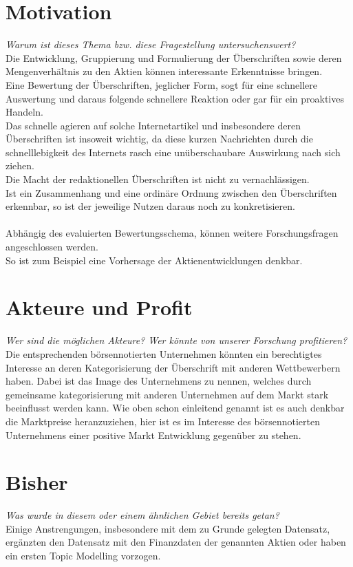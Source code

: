 \section{Motivation}
{\scriptsize \textit{Warum ist dieses Thema bzw. diese Fragestellung untersuchenswert?}}\\
Die Entwicklung, Gruppierung und Formulierung der Überschriften sowie deren Mengenverhältnis zu den Aktien können interessante Erkenntnisse bringen.\\
Eine Bewertung der Überschriften, jeglicher Form, sogt für eine schnellere Auswertung und daraus folgende schnellere Reaktion oder gar für ein proaktives Handeln.\\
Das schnelle agieren auf solche Internetartikel und insbesondere deren Überschriften ist insoweit wichtig, da diese kurzen Nachrichten durch die schnelllebigkeit des Internets rasch eine unüberschaubare Auswirkung nach sich ziehen. \\
Die Macht der redaktionellen Überschriften ist nicht zu vernachlässigen. \\
Ist ein Zusammenhang und eine ordinäre Ordnung zwischen den Überschriften erkennbar, so ist der jeweilige Nutzen daraus noch zu konkretisieren.\\
\\ Abhängig des evaluierten Bewertungsschema, können weitere Forschungsfragen angeschlossen werden.\\ 
So ist zum Beispiel eine Vorhersage der Aktienentwicklungen denkbar.


\section{Akteure und Profit}
{\scriptsize \textit{Wer sind die möglichen Akteure? Wer könnte von unserer Forschung profitieren?}}\\
Die entsprechenden börsennotierten Unternehmen könnten ein berechtigtes Interesse an deren Kategorisierung der Überschrift mit anderen Wettbewerbern haben.
Dabei ist das Image des Unternehmens zu nennen, welches durch gemeinsame kategorisierung mit anderen Unternehmen auf dem Markt stark beeinflusst werden kann.
Wie oben schon einleitend genannt ist es auch denkbar die Marktpreise heranzuziehen, hier ist es im Interesse des börsennotierten Unternehmens einer positive Markt Entwicklung gegenüber zu stehen.

\section{Bisher}
{\scriptsize \textit{Was wurde in diesem oder einem ähnlichen Gebiet bereits getan?}}\\
Einige Anstrengungen, insbesondere mit dem zu Grunde gelegten Datensatz, ergänzten den Datensatz mit den Finanzdaten der genannten Aktien oder haben ein ersten Topic Modelling vorzogen.

